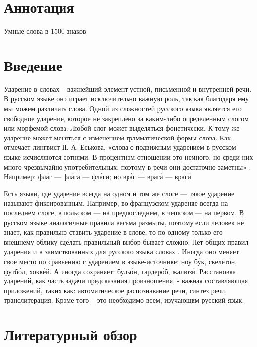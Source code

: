\documentclass[14pt, a4paper, russian]{report}
\begin{document}
\newpage
\begin{normalsize}
\chapter*{Аннотация}


Умные слова в 1500 знаков


\tableofcontents{}


\chapter*{Введение}
Ударение в словах – важнейший элемент устной, письменной и внутренней речи. В русском языке оно играет исключительно важную роль, так как благодаря ему мы можем различать слова. Одной из сложностей русского языка является его свободное ударение, которое не закреплено за каким-либо определенным слогом или морфемой слова. Любой слог может выделяться фонетически. К тому же ударение  может меняться с изменением грамматической формы слова. Как отмечает лингвист Н. А. Еськова, «слова с подвижным ударением в русском языке исчисляются сотнями. В процентном отношении это немного, но среди них много чрезвычайно употребительных, поэтому в речи они достаточно заметны» \cite{eskina}. Например: фл\'{а}г — фл\'{а}га — фл\'{а}ги; но вр\'{а}г — враг\'{а} — враг\'{и} 

Есть языки, где ударение  всегда на одном и том же слоге — такое ударение называют фиксированным. Например, во французском ударение всегда на последнем слоге, в польском — на предпоследнем, в чешском — на первом. В русском языке аналогичные правила весьма размыты, поэтому если человек не знает, как правильно ставить ударение в слове, то по одному только его внешнему облику сделать правильный выбор бывает сложно.  Нет общих правил ударения и в заимствованных для русского языка словах . Иногда оно меняет свое место по сравнению с ударением в языке-источнике: ноутб\'{у}к, скелет\'{о}н, футб\'{о}л, хокк\'{е}й. А иногда сохраняет: буль\'{о}н, гардер\'{о}б, жалюз\'{и}.
Расстановка ударений, как часть задачи предсказания произношения, - важная составляющая  приложений, таких как: автоматическое распознавание речи, синтез речи, транслитерация. Кроме того – это необходимо всем, изучающим русский язык.


\newpage

\chapter{Литературный обзор}


\end{normalsize}
\end{document}
